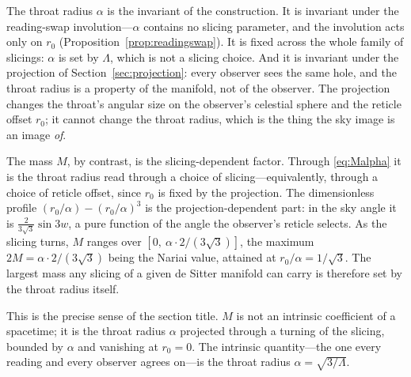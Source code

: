 \documentclass[11pt,a4paper]{article}
\theoremstyle{definition}
\begin{document}
The throat radius $\alpha$ is the invariant of the construction. It is invariant under the reading-swap involution---$\alpha$ contains no slicing parameter, and the involution acts only on $r_{0}$ (Proposition~\ref{prop:readingswap}). It is fixed across the whole family of slicings: $\alpha$ is set by $\Lambda$, which is not a slicing choice. And it is invariant under the projection of Section~\ref{sec:projection}: every observer sees the same hole, and the throat radius is a property of the manifold, not of the observer. The projection changes the throat's angular size on the observer's celestial sphere and the reticle offset $r_{0}$; it cannot change the throat radius, which is the thing the sky image is an image \emph{of}.

The mass $M$, by contrast, is the slicing-dependent factor. Through \eqref{eq:Malpha} it is the throat radius read through a choice of slicing---equivalently, through a choice of reticle offset, since $r_{0}$ is fixed by the projection. The dimensionless profile $(r_{0}/\alpha)-(r_{0}/\alpha)^{3}$ is the projection-dependent part: in the sky angle it is $\tfrac{2}{3\sqrt3}\sin 3w$, a pure function of the angle the observer's reticle selects. As the slicing turns, $M$ ranges over $[0,\ \alpha\cdot2/(3\sqrt3)]$, the maximum $2M=\alpha\cdot2/(3\sqrt3)$ being the Nariai value, attained at $r_{0}/\alpha=1/\sqrt3$. The largest mass any slicing of a given de Sitter manifold can carry is therefore set by the throat radius itself.

This is the precise sense of the section title. $M$ is not an intrinsic coefficient of a spacetime; it is the throat radius $\alpha$ projected through a turning of the slicing, bounded by $\alpha$ and vanishing at $r_{0}=0$. The intrinsic quantity---the one every reading and every observer agrees on---is the throat radius $\alpha=\sqrt{3/\Lambda}$.
\end{document}
